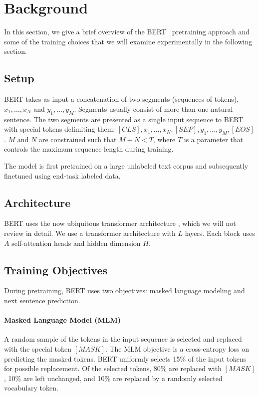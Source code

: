 \section{Background} \label{sec:background}

In this section, we give a brief overview of the BERT~\cite{devlin2018bert} pretraining approach and some of the training choices that we will examine experimentally in the following section.

\subsection{Setup}
BERT takes as input a concatenation of two segments (sequences of tokens), $x_1 , \ldots , x_N$ and $y_1 , \ldots , y_M$.
Segments usually consist of more than one natural sentence.
The two segments are presented as a single input sequence to BERT with special tokens delimiting them: $[\mathit{CLS}], x_1 , \ldots , x_N, [\mathit{SEP}], y_1 , \ldots , y_M, [\mathit{EOS}]$.
$M$ and $N$ are constrained such that $M + N < T$, where $T$ is a parameter that controls the maximum sequence length during training.

The model is first pretrained on a large unlabeled text corpus and subsequently finetuned using end-task labeled data.

\subsection{Architecture}
BERT uses the now ubiquitous transformer architecture \cite{vaswani2017attention}, which we will not review in detail. We use a transformer architecture with $L$ layers. Each block uses $A$ self-attention heads and hidden dimension $H$.

\subsection{Training Objectives}

During pretraining, BERT uses two objectives: masked language modeling and next sentence prediction. 

\paragraph{Masked Language Model (MLM)} A random sample of the tokens in the input sequence is selected and replaced with the special token $[\mathit{MASK}]$. The MLM objective is a cross-entropy loss on predicting the masked tokens. BERT uniformly selects 15\% of the input tokens for possible replacement. Of the selected tokens, 80\% are replaced with $[\mathit{MASK}]$, 10\% are left unchanged, and 10\% are replaced by a randomly selected vocabulary token. 
    
